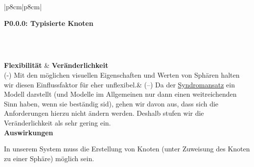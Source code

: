 \documentclass[enabledeprecatedfontcommands,fontsize=11pt,paper=a4,twoside]{scrartcl}
\newcounter{one}
\newcounter{two}[one]
\newcounter{three}[two]
\newcommand{\tone}{0\theone}
\newcommand{\ttwo}{0\thetwo}
\newcommand{\three}{\stepcounter{three}0\thethree}
\begin{document}
\begin{tabular} {|p{8cm}|p{8cm}|}
	\hline
	 {\parbox{16cm}{\textbf{\hypertarget{p}{P\tone.\ttwo.\three}: Typisierte Knoten}} } \\ \hline\hline 
	\rule{0pt}{5ex}\\ [2ex] \hline
	\textbf{Flexibilität}  & \textbf{Veränderlichkeit} \\
	(-) Mit den möglichen visuellen Eigenschaften und Werten von Sphären halten wir diesen Einflussfaktor für eher unflexibel.& 
	(–) Da der \hyperlink{Syndromansatz}{Syndromansatz} ein Modell darstellt (und Modelle im Allgemeinen nur dann einen weitreichenden Sinn haben, wenn sie beständig sid), gehen wir davon aus, dass sich die Anforderungen hierzu nicht ändern werden. Deshalb stufen wir die Veränderlichkeit als sehr gering ein.\\
	\hline
	 {\textbf{Auswirkungen}} \\
	 {\parbox{16cm}{In unserem System muss die Erstellung von Knoten (unter Zuweisung des Knoten zu einer Sphäre) möglich sein.} }\\ \hline
\end{tabular}
\\ \\ \\ \\%
\end{document}

